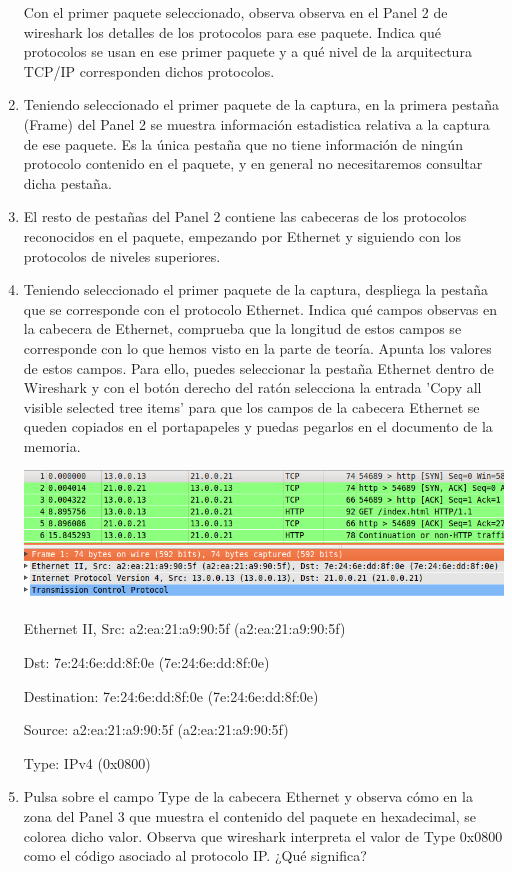 \documentclass[12pt, a4paper]{report}
\begin{document}
\begin{enumerate}
	Con el primer paquete seleccionado, observa observa en el Panel 2 de wireshark los detalles de los protocolos
	para ese paquete. Indica qué protocolos se usan en ese primer paquete y a qué nivel de la arquitectura
	TCP/IP corresponden dichos protocolos.
	\item Teniendo seleccionado el primer paquete de la captura, en la primera pestaña (Frame) del Panel 2 se muestra
	información estadistica relativa a la captura de ese paquete. Es la única pestaña que no tiene información
	de ningún protocolo contenido en el paquete, y en general no necesitaremos consultar dicha pestaña.
	\item El resto de pestañas del Panel 2 contiene las cabeceras de los protocolos reconocidos en el paquete, empezando
	por Ethernet y siguiendo con los protocolos de niveles superiores.
	\item Teniendo seleccionado el primer paquete de la captura, despliega la pestaña que se corresponde con el
	protocolo Ethernet. Indica qué campos observas en la cabecera de Ethernet, comprueba que la longitud
	de estos campos se corresponde con lo que hemos visto en la parte de teoría. Apunta los valores de estos
	campos. Para ello, puedes seleccionar la pestaña Ethernet dentro de Wireshark y con el botón derecho del
	ratón selecciona la entrada ’Copy all visible selected tree items’ para que los campos de la cabecera Ethernet
	se queden copiados en el portapapeles y puedas pegarlos en el documento de la memoria.
	
	\includegraphics*[width=128mm,scale=0.5,center]{enunciado2}
	
	Ethernet II, Src: a2:ea:21:a9:90:5f (a2:ea:21:a9:90:5f) 
	
	Dst: 7e:24:6e:dd:8f:0e (7e:24:6e:dd:8f:0e)
	
	Destination: 7e:24:6e:dd:8f:0e (7e:24:6e:dd:8f:0e)
	
	Source: a2:ea:21:a9:90:5f (a2:ea:21:a9:90:5f)
	
	Type: IPv4 (0x0800)
	\item Pulsa sobre el campo Type de la cabecera Ethernet y observa cómo en la zona del Panel 3 que muestra el
	contenido del paquete en hexadecimal, se colorea dicho valor. Observa que wireshark interpreta el valor de
	Type 0x0800 como el código asociado al protocolo IP. ¿Qué significa?
	

\end{enumerate}
\end{document}
